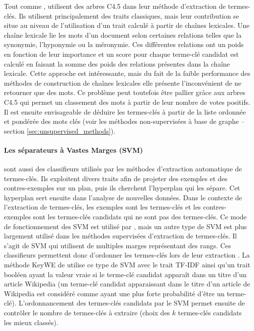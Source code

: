           Tout comme \citet{turney1999learningalgorithms},
          \citet{ercan2007lexicalchains} utilisent des arbres C4.5 dans leur
          méthode d'extraction de termes-clés. Ils utilisent principalement des
          traits classiques, mais leur contribution se situe au niveau de
          l'utilisation d'un trait calculé à partir de chaînes lexicales. Une
          chaîne lexicale lie les mots d'un document selon certaines relations
          telles que la synonymie, l'hyponymie ou la méronymie. Ces différentes
          relations ont un poids en fonction de leur importance et un score pour
          chaque terme-clé candidat est calculé en faisant la somme des poids
          des relations présentes dans la chaîne lexicale. Cette approche est
          intéressante, mais du fait de la faible performance des méthodes de
          construction de chaînes lexicales elle présente l'inconvénient de ne
          retourner que des mots. Ce problème peut toutefois être pallier grâce
          aux arbres C4.5 qui permet un classement des mots à partir de leur
          nombre de votes positifs. Il est ensuite envisageable de déduire les
          termes-clés à partir de la liste ordonnée et pondérée des mots clés
          (voir les méthodes non-supervisées à base de graphe -- section
          \ref{sec:unsupervised_methods}).

        \paragraph{Les séparateurs à Vastes Marges (SVM)}
          sont aussi des classifieurs utilisés par les méthodes d'extraction
          automatique de termes-clés. Ils exploitent divers traits afin de
          projeter des exemples et des contres-exemples sur un plan, puis ils
          cherchent l'hyperplan qui les sépare. Cet hyperplan sert ensuite dans
          l'analyse de nouvelles données. Dans le contexte de l'extraction de
          termes-clés, les exemples sont les termes-clés et les contres-exemples
          sont les termes-clés candidats qui ne sont pas des termes-clés. Ce
          mode de fonctionnement des SVM est utilisé par \citet{zhang2006svm},
          mais un autre type de SVM est plus largement utilisé dans les méthodes
          supervisées d'extraction de termes-clés. Il s'agit de SVM qui
          utilisent de multiples marges représentant des rangs. Ces classifieurs
          permettent donc d'ordonner les termes-clés lors de leur extraction
          \citep{herbrich1999svm, joachims2006linearsvm, jiang2009rankingsvm}.
          La méthode KeyWE de \citet{eichler2010keywe} utilise ce type de SVM
          avec le trait TF-IDF ainsi qu'un trait booléen ayant la valeur vraie
          si le terme-clé candidat apparaît dans un titre d'un article Wikipedia
          (un terme-clé candidat apparaissant dans le titre d'un article de
          Wikipedia est considéré comme ayant une plus forte probabilité d'être
          un terme-clé). L'ordonnancement des termes-clés candidats par le SVM
          permet ensuite de contrôler le nombre de termes-clés à extraire (choix
          des $k$ termes-clés candidats les mieux classés).

